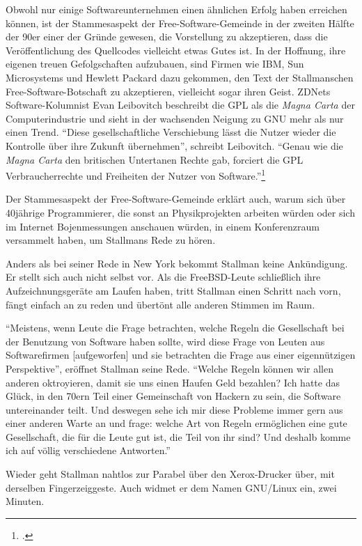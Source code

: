 Obwohl nur einige Softwareunternehmen einen ähnlichen Erfolg haben erreichen können, ist der Stammesaspekt der Free-Software-Gemeinde in der zweiten Hälfte der 90er einer der Gründe gewesen, die Vorstellung zu akzeptieren, dass die Veröffentlichung des Quellcodes vielleicht etwas Gutes ist. In der Hoffnung, ihre eigenen treuen Gefolgschaften aufzubauen, sind Firmen wie IBM, Sun Microsystems und Hewlett Packard dazu gekommen, den Text der Stallmanschen Free-Software-Botschaft zu akzeptieren, vielleicht sogar ihren Geist. ZDNets Software-Kolumnist Evan Leibovitch beschreibt die GPL als die \textit{Magna Carta} der Computerindustrie und sieht in der wachsenden Neigung zu GNU mehr als nur einen Trend. "`Diese gesellschaftliche Verschiebung lässt die Nutzer wieder die Kontrolle über ihre Zukunft übernehmen"', schreibt Leibovitch. "`Genau wie die \textit{Magna Carta} den britischen Untertanen Rechte gab, forciert die GPL Verbraucherrechte und Freiheiten der Nutzer von Software."'\footcite[Vgl.][]{whosafraid}

Der Stammesaspekt der Free-Software-Gemeinde erklärt auch, warum sich über 40jährige Programmierer, die sonst an Physikprojekten arbeiten würden oder sich im Internet  Bojenmessungen anschauen würden, in einem Konferenzraum versammelt haben, um Stallmans Rede zu hören.

Anders als bei seiner Rede in New York bekommt Stallman keine Ankündigung. Er stellt sich auch nicht selbst vor. Als die FreeBSD-Leute schließlich ihre Aufzeichnungsgeräte am Laufen haben, tritt Stallman einen Schritt nach vorn, fängt einfach an zu reden und übertönt alle anderen Stimmen im Raum.

"`Meistens, wenn Leute die Frage betrachten, welche Regeln die Gesellschaft bei der Benutzung von Software haben sollte, wird diese Frage von Leuten aus Softwarefirmen [aufgeworfen] und sie betrachten die Frage aus einer eigennützigen Perspektive"', eröffnet Stallman seine Rede. "`Welche Regeln können wir allen anderen oktroyieren, damit sie uns einen Haufen Geld bezahlen? Ich hatte das Glück, in den 70ern Teil einer Gemeinschaft von Hackern zu sein, die Software untereinander teilt. Und deswegen sehe ich mir diese Probleme immer gern aus einer anderen Warte an und frage: welche Art von Regeln ermöglichen eine gute Gesellschaft, die für die Leute gut ist, die Teil von ihr sind? Und deshalb komme ich auf völlig verschiedene Antworten."'

Wieder geht Stallman nahtlos zur Parabel über den Xerox-Drucker über, mit derselben Fingerzeiggeste. Auch widmet er dem Namen GNU/Linux ein, zwei Minuten.

